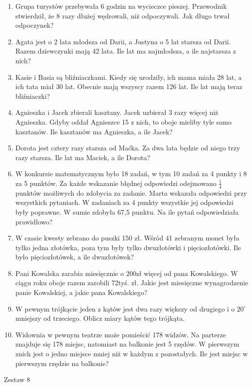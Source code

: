 \documentclass[12pt,a4paper]{article}
\begin{document}
\begin{enumerate}[1.]
	\item Grupa turystów przebywała 6 godzin na wycieczce pieszej. Przewodnik stwierdził, że 8 razy dłużej wędrowali, niż odpoczywali. Jak długo trwał odpoczynek?
	\item Agata jest o 2 lata młodsza od Darii, a Justyna o 5 lat starsza od Darii. Razem dziewczynki mają 42 lata. Ile lat ma najmłodsza, a ile najstarsza z nich?
	\item Kasie i Basia są bliźniaczkami. Kiedy się urodziły, ich mama miała 28 lat, a ich tata miał 30 lat. Obecnie mają wszyscy razem 126 lat. Ile lat mają teraz bliźniaczki?
	\item Agnieszka i Jacek zbierali kasztany. Jacek uzbierał 3 razy więcej niż Agnieszka. Gdyby oddał Agnieszce 15 z nich, to oboje mieliby tyle samo kasztanów. Ile kasztanów ma Agnieszka, a ile Jacek?
	\item Dorota jest cztery razy starsza od Maćka. Za dwa lata będzie od niego trzy razy starsza. Ile lat ma Maciek, a ile Dorota?
	\item W konkursie matematycznym było 18 zadań, w tym 10 zadań za 4 punkty i 8 za 5 punktów. Za każde wskazanie błędnej odpowiedzi odejmowano $\frac{1}{4}$ punktów możliwych do zdobycia za zadanie. Marta wskazała odpowiedzi przy wszystkich pytaniach. W zadaniach za 4 punkty wszystkie jej odpowiedzi były poprawne. W sumie zdobyła 67,5 punktu. Na ile pytań odpowiedziała prawidłowo?
	\item W czasie kwesty zebrano do puszki 150 zł. Wśród 41 zebranym monet była tylko jedna złotówka, poza tym były tylko dwuzłotówki i pięciozłotówki. Ile było pięciozłotówek, a ile dwuzłotówek?
	\item Pani Kowalska zarabia miesięcznie o 200zł więcej od pana Kowalskiego. W ciągu roku oboje razem zarobili 72tyś. zł. Jakie jest miesięczne wynagrodzenie panie Kowalskiej, a jakie pana Kowalskiego?
	\item W pewnym trójkącie jeden z kątów jest dwa razy większy od drugiego i o $20^\circ$ mniejszy od trzeciego. Oblicz miary kątów tego trójkąta.
	\item Widownia w pewnym teatrze może pomieścić 178 widzów. Na parterze znajduje się 178 miejsc, natomiast na balkonie jest 5 rzędów. W pierwszym znich jest o jedno miejsce mniej niż w każdym z pozostałych. Ile jest miejsc w pierwszym rzędzie na balkonie?
\end{enumerate}
\newpage
\LARGE \begin{center}
	Zestaw 8
\end{center}
\end{document}
